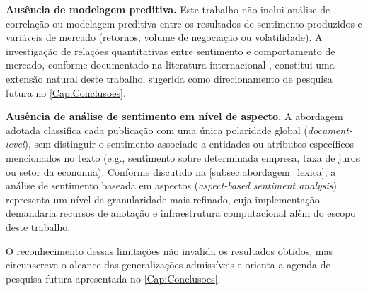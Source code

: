 \textbf{Ausência de modelagem preditiva.} Este trabalho não inclui análise de correlação ou modelagem preditiva entre os resultados de sentimento produzidos e variáveis de mercado (retornos, volume de negociação ou volatilidade). A investigação de relações quantitativas entre sentimento e comportamento de mercado, conforme documentado na literatura internacional \cite{tetlock2007,bollen2011,ranco2015}, constitui uma extensão natural deste trabalho, sugerida como direcionamento de pesquisa futura no \autoref{Cap:Conclusoes}.

\textbf{Ausência de análise de sentimento em nível de aspecto.} A abordagem adotada classifica cada publicação com uma única polaridade global (\textit{document-level}), sem distinguir o sentimento associado a entidades ou atributos específicos mencionados no texto (e.g., sentimento sobre determinada empresa, taxa de juros ou setor da economia). Conforme discutido na \autoref{subsec:abordagem_lexica}, a análise de sentimento baseada em aspectos (\textit{aspect-based sentiment analysis}) representa um nível de granularidade mais refinado, cuja implementação demandaria recursos de anotação e infraestrutura computacional além do escopo deste trabalho.

O reconhecimento dessas limitações não invalida os resultados obtidos, mas circunscreve o alcance das generalizações admissíveis e orienta a agenda de pesquisa futura apresentada no \autoref{Cap:Conclusoes}.
